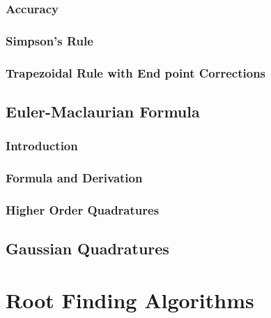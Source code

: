 \documentclass[
]{book}
\begin{document}
\hypertarget{accuracy}{%
\subsection{Accuracy}\label{accuracy}}

\hypertarget{simpsons-rule}{%
\subsection{Simpson's Rule}\label{simpsons-rule}}

\hypertarget{trapezoidal-rule-with-end-point-corrections}{%
\subsection{Trapezoidal Rule with End point Corrections}\label{trapezoidal-rule-with-end-point-corrections}}

\hypertarget{euler-maclaurian-formula}{%
\section{Euler-Maclaurian Formula}\label{euler-maclaurian-formula}}

\hypertarget{introduction-1}{%
\subsection{Introduction}\label{introduction-1}}

\hypertarget{formula-and-derivation}{%
\subsection{Formula and Derivation}\label{formula-and-derivation}}

\hypertarget{higher-order-quadratures}{%
\subsection{Higher Order Quadratures}\label{higher-order-quadratures}}

\hypertarget{gaussian-quadratures}{%
\section{Gaussian Quadratures}\label{gaussian-quadratures}}

\hypertarget{root-finding-algorithms}{%
\chapter{Root Finding Algorithms}\label{root-finding-algorithms}}
\end{document}
